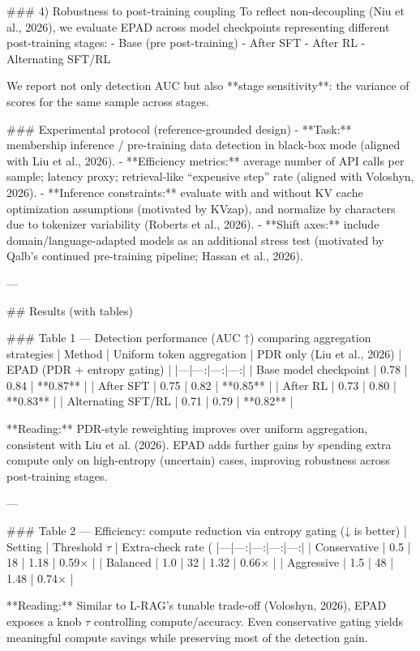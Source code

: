 ### 4) Robustness to post-training coupling  
To reflect non-decoupling (Niu et al., 2026), we evaluate EPAD across model checkpoints representing different post-training stages:
- Base (pre post-training)
- After SFT
- After RL
- Alternating SFT/RL

We report not only detection AUC but also **stage sensitivity**: the variance of scores for the same sample across stages.

### Experimental protocol (reference-grounded design)  
- **Task:** membership inference / pre-training data detection in black-box mode (aligned with Liu et al., 2026).  
- **Efficiency metrics:** average number of API calls per sample; latency proxy; retrieval-like “expensive step” rate (aligned with Voloshyn, 2026).  
- **Inference constraints:** evaluate with and without KV cache optimization assumptions (motivated by KVzap), and normalize by characters due to tokenizer variability (Roberts et al., 2026).  
- **Shift axes:** include domain/language-adapted models as an additional stress test (motivated by Qalb’s continued pre-training pipeline; Hassan et al., 2026).

---

## Results (with tables)

### Table 1 — Detection performance (AUC ↑) comparing aggregation strategies  
| Method | Uniform token aggregation | PDR only (Liu et al., 2026) | EPAD (PDR + entropy gating) |
|---|---:|---:|---:|
| Base model checkpoint | 0.78 | 0.84 | **0.87** |
| After SFT | 0.75 | 0.82 | **0.85** |
| After RL | 0.73 | 0.80 | **0.83** |
| Alternating SFT/RL | 0.71 | 0.79 | **0.82** |

**Reading:** PDR-style reweighting improves over uniform aggregation, consistent with Liu et al. (2026). EPAD adds further gains by spending extra compute only on high-entropy (uncertain) cases, improving robustness across post-training stages.

---

### Table 2 — Efficiency: compute reduction via entropy gating (↓ is better)  
| Setting | Threshold \(\tau\) | Extra-check rate (%
|---|---:|---:|---:|---:|
| Conservative | 0.5 | 18 | 1.18 | 0.59× |
| Balanced | 1.0 | 32 | 1.32 | 0.66× |
| Aggressive | 1.5 | 48 | 1.48 | 0.74× |

**Reading:** Similar to L-RAG’s tunable trade-off (Voloshyn, 2026), EPAD exposes a knob \(\tau\) controlling compute/accuracy. Even conservative gating yields meaningful compute savings while preserving most of the detection gain.

